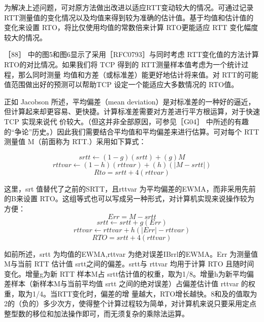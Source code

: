 为解决上述问题，可对原方法做出改进以适应RTT变动较大的情况。可通过记录 RTT测量值的变化情况以及均值来得到较为准确的估计值。基于均值和估计值的变化来设置
RTO，将比仅使用均值的常数倍来计算 RTO更能适应 RTT 变化幅度较大的情况。

［88］ 中的图5和图6显示了采用［RFC0793］与同时考虑 RTT变化值的方法计算 RTO的对比情况。如果我们将 TCP 得到的 RTT测量样本值考虑为一个统计过程，那么同时测量
均值和方差（或标准差）能更好地估计将来值。对 RTT的可能值范围做出好的预测可以帮助TCP 设定一个能适应大多数情况的 RTO值。

正如 Jacobson 所述，平均偏差（mean deviation）是对标准差的一种好的逼近，但计算起来却更容易、更快捷。计算标准差需要对方差进行平方根运算，对于快速 TCP 实现来说代
价较大。（但这并非全部原因，可参见［G04］ 中所述的有趣的“争论”历史。）因此我们需要结合平均值和平均偏差来进行估算。可对每个 RTT 测量值 M（前面称为 RTT.）采用如下算式：

\begin{equation}
    srtt \leftarrow (1-g)(srtt) + (g)M
\end{equation}
\begin{equation}
    rttvar \leftarrow (1-h)(rttvar) + (h)(|M-srtt|)    
\end{equation}
\begin{equation}
    Rto = srtt + 4(rttvar)
\end{equation}

这里，srt 值替代了之前的SRTT，且rttvar 为平均偏差的EWMA，而非采用先前的B来设置 RTO。这组等式也可以写成另一种形式，对计算机实现来说操作较为方便：
\begin{equation}
    Err = M - srtt
\end{equation}
\begin{equation}
    srtt \leftarrow srtt + g(Err)
\end{equation}
\begin{equation}
    rttvar \leftarrow rttvar + h(|Err| - rttvar)
\end{equation}
\begin{equation}
    RTO = srtt + 4(rttvar)
\end{equation}

如前所述，srtt 为均值的EWMA,rttvar 为绝对误差IBrrl的EWMA。Err 为测量值 M与当前 RTT 估计值 srtt之间的偏差。srtt与 rttvar 均用于计算 RTO 且随时间变化。增量g为新
RTT 样本M占 srtt估计值的权重，取为1/8。增量h为新平均偏差样本（新样本M与当前平均值 srtt 之间的绝对误差）占偏差估计值 rttvar 的权重，取为1/4。当RTT变化时，偏差的增
量越大，RTO增长越快。8和及的值取为2的（负的）多少次方，使得整个计算过程较为简单，对计算机来说只要采用定点整型数的移位和加法操作即可，而无须复杂的乘除法运算。

